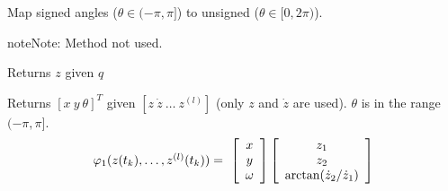 \documentclass[letterpaper,10pt,english]{sphinxmanual}
\begin{document}
\begin{fulllineitems}
\begin{fulllineitems}
\label{Multi-robot motion planner:planning_sim.UnicycleKineModel._unsigned_angle}
Map signed angles (\(\theta \in (-\pi, \pi]\)) to unsigned
(\(\theta \in [0, 2\pi)\)).

\begin{notice}{note}{Note:}
Method not used.
\end{notice}

\end{fulllineitems}


\begin{fulllineitems}
\label{Multi-robot motion planner:planning_sim.UnicycleKineModel.phi_0}
Returns \(z\) given \(q\)

\end{fulllineitems}


\begin{fulllineitems}
\label{Multi-robot motion planner:planning_sim.UnicycleKineModel.phi_1}
Returns \([x\ y\ \theta]^T\) given \([z\ \dot{z}\ \dotsc\ z^{(l)}]\)
(only \(z\) and \(\dot{z}\) are used). \(\theta\) is in the range
\((-\pi, \pi]\).
\begin{gather}
\begin{split}\begin{array}{l}
\varphi_1(z(t_k),\dotsc,z^{(l)}(t_k))=\
\left[\begin{array}{c}
x\\
y\\
\omega
\end{array}\right]
\left[\begin{array}{c}
z_1\\
z_2\\
\arctan(\dot{z}_2/\dot{z}_1)\\
\end{array}\right]
\end{array}\end{split}\notag
\end{gather}
\end{fulllineitems}



\end{fulllineitems}
\end{document}
